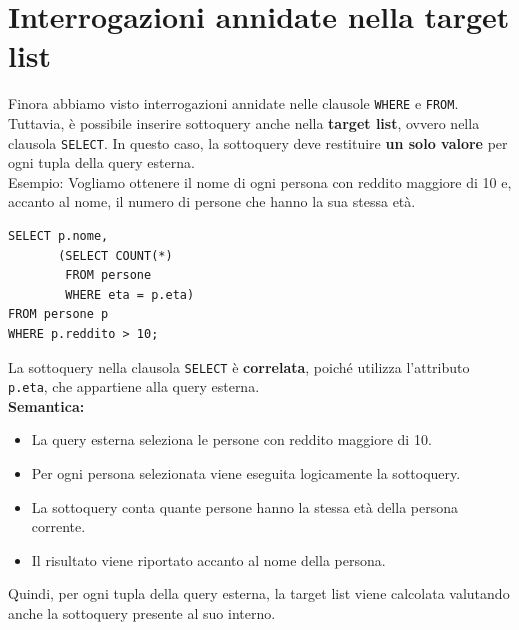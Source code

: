 \section{Interrogazioni annidate nella target list}
Finora abbiamo visto interrogazioni annidate nelle clausole
\texttt{WHERE} e \texttt{FROM}. Tuttavia, è possibile
inserire sottoquery anche nella \textbf{target list},
ovvero nella clausola \texttt{SELECT}.
In questo caso, la sottoquery deve restituire
\textbf{un solo valore} per ogni tupla della query esterna.\\
\textcolor{verdeEsempio}{Esempio: }
Vogliamo ottenere il nome di ogni persona con reddito
maggiore di 10 e, accanto al nome, il numero di persone
che hanno la sua stessa età.
\begin{verbatim}
SELECT p.nome,
       (SELECT COUNT(*)
        FROM persone
        WHERE eta = p.eta)
FROM persone p
WHERE p.reddito > 10;
\end{verbatim}
La sottoquery nella clausola \texttt{SELECT} è
\textbf{correlata}, poiché utilizza l'attributo
\texttt{p.eta}, che appartiene alla query esterna.\\
\textbf{Semantica:}
\begin{itemize}
    \item La query esterna seleziona le persone
    con reddito maggiore di 10.
    \item Per ogni persona selezionata viene
    eseguita logicamente la sottoquery.
    \item La sottoquery conta quante persone
    hanno la stessa età della persona corrente.
    \item Il risultato viene riportato accanto
    al nome della persona.
\end{itemize}
Quindi, per ogni tupla della query esterna,
la target list viene calcolata valutando
anche la sottoquery presente al suo interno.
